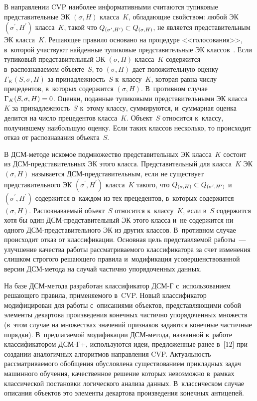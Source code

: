 \begin{multicols}{2}
  В направлении CVP наиболее информативными считаются тупиковые 
представительные ЭК $(\sigma, H)$  класса~$K$, обладающие свойством: 
любой ЭК $(\sigma^\prime, H^\prime)$ класса~$K$, такой что $Q_{(\sigma^\prime, 
H^\prime)} \hm\subset Q_{(\sigma, H)}$, не является представительным ЭК 
класса~$K$. Решающее правило основано на процедуре <<голосования>>, 
в~которой участ\-ву\-ют найденные тупиковые представительные ЭК 
классов~\cite{11-duk}. Если тупиковый представительный ЭК $(\sigma, H)$  
класса~$K$ содержится в~распознаваемом объекте~$S$, то $(\sigma, H)$ дает 
положительную оценку $\Gamma_K(S,\sigma, H)$ за принадлежность~$S$ 
к~классу~$K$, которая равна числу прецедентов, в~которых содержится 
$(\sigma, H)$. В~противном случае $\Gamma_K(S,\sigma, H)\hm=0$. Оценки, 
поданные тупиковыми представительными ЭК класса~$K$ за 
принадлежность~$S$  к~этому классу, суммируются, и~суммарная оценка 
делится на число прецедентов класса~$K$. Объект~$S$ относится к~классу, 
получившему наибольшую оценку. Если таких классов несколько, то 
происходит отказ от распознавания объекта~$S$.
  
  В ДСМ-методе искомое подмножество представительных ЭК класса~$K$ 
состоит из ДСМ-пред\-ста\-ви\-тель\-ных ЭК этого класса. Представительный 
для класса~$K$ ЭК $(\sigma, H)$ называется ДСМ-пред\-ста\-ви\-тель\-ным, 
если не существует представительного ЭК $(\sigma^\prime, H^\prime)$ 
класса~$K$ такого, что $Q_{(\sigma, H)} \hm\subset Q_{(\sigma^\prime, 
H^\prime)}$ и~$(\sigma^\prime, H^\prime)$ содержится в~каждом из тех 
прецедентов, в~которых содержится $(\sigma, H)$. Распознаваемый объект~$S$ 
относится к~классу~$K$, если в~$S$ содержится хотя бы один  
ДСМ-пред\-ста\-ви\-тель\-ный ЭК этого класса и~не содержится ни одного  
ДСМ-пред\-ста\-ви\-тель\-но\-го ЭК из других классов. В~противном случае 
происходит отказ от классификации. Основная цель представляемой работы~--- 
улучшение качества работы рассматриваемого классификатора за счет 
изменения слишком строгого решающего правила и~модификация 
усовершенствованной версии ДСМ-ме\-то\-да на случай час\-тич\-но 
упорядоченных данных. 
  
  На базе ДСМ-ме\-то\-да разработан классификатор ДСМ-Г с~использованием 
решающего правила, применяемого в~CVP. Новый классификатор 
модифицирован для работы с~описаниями объектов, представляющими собой 
элементы декартова произведения конечных час\-тич\-но упорядоченных 
множеств (в~этом случае на множествах значений признаков задаются конечные 
час\-тич\-ные порядки). В~предлагаемой модификации ДСМ-ме\-то\-да, названной 
в~работе классификатором \mbox{ДСМ-Г+}, используются идеи, предложенные ранее 
в~[12] при создании аналогичных алгоритмов направления CVP. Актуальность 
рассматриваемого обобщения обусловлена существованием прикладных задач 
машинного обуче\-ния, качественное решение которых невозможно в~рамках 
классической постановки логического анализа данных. В~классическом случае 
описания объектов это элементы декартова произведения конечных антицепей. 
  

\end{multicols}
